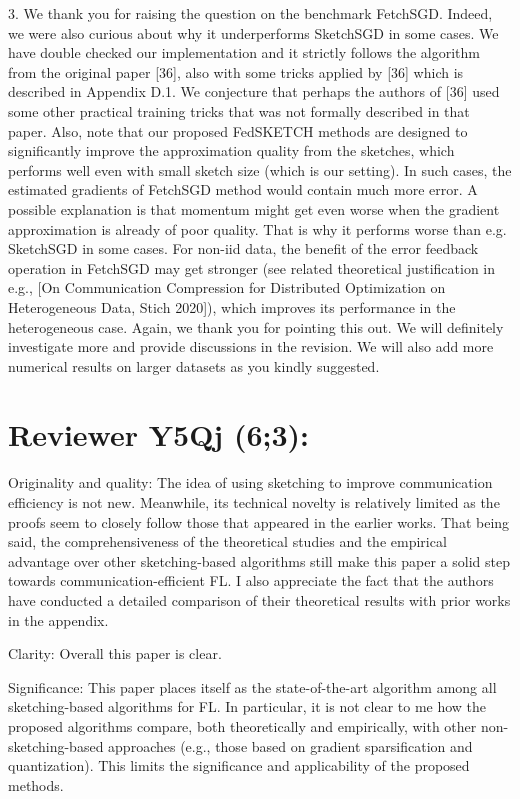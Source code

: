 \documentclass{article}
\begin{document}
3. We thank you for raising the question on the benchmark FetchSGD. Indeed, we were also curious about why it underperforms SketchSGD in some cases. We have double checked our implementation and it strictly follows the algorithm from the original paper [36], also with some tricks applied by [36] which is described in Appendix D.1. We conjecture that perhaps the authors of [36] used some other practical training tricks that was not formally described in that paper. Also, note that our proposed FedSKETCH methods are designed to significantly improve the approximation quality from the sketches, which performs well even with small sketch size (which is our setting). In such cases, the estimated gradients of FetchSGD method would contain much more error. A possible explanation is that momentum might get even worse when the gradient approximation is already of poor quality. That is why it performs worse than e.g. SketchSGD in some cases. For non-iid data, the benefit of the error feedback operation in FetchSGD may get stronger (see related theoretical justification in e.g., [On Communication Compression for Distributed Optimization on Heterogeneous Data, Stich 2020]), which improves its performance in the heterogeneous case. Again, we thank you for pointing this out. We will definitely investigate more and provide discussions in the revision. We will also add more numerical results on larger datasets as you kindly suggested.


\section{Reviewer Y5Qj (6;3):}

Originality and quality: The idea of using sketching to improve communication efficiency is not new. Meanwhile, its technical novelty is relatively limited as the proofs seem to closely follow those that appeared in the earlier works. That being said, the comprehensiveness of the theoretical studies and the empirical advantage over other sketching-based algorithms still make this paper a solid step towards communication-efficient FL. I also appreciate the fact that the authors have conducted a detailed comparison of their theoretical results with prior works in the appendix.

Clarity: Overall this paper is clear.

Significance: This paper places itself as the state-of-the-art algorithm among all sketching-based algorithms for FL. In particular, it is not clear to me how the proposed algorithms compare, both theoretically and empirically, with other non-sketching-based approaches (e.g., those based on gradient sparsification and quantization). This limits the significance and applicability of the proposed methods.
\end{document}
